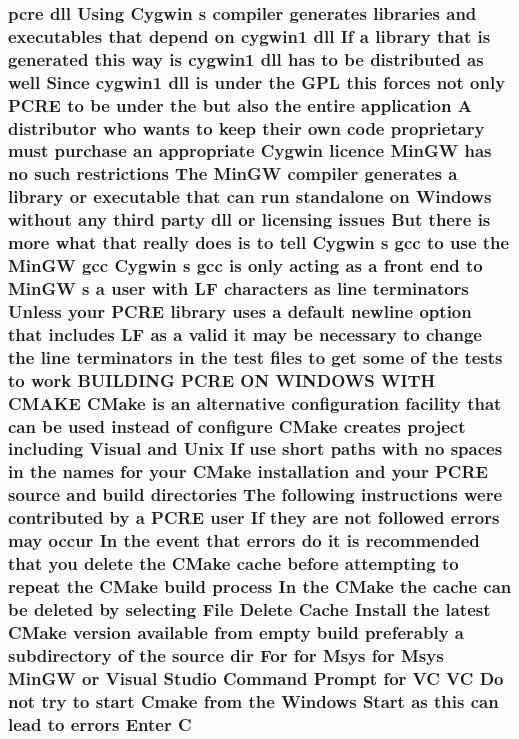 \subsubsection[{\texorpdfstring{C}{C}}]{ {\bf pcre} dll Using Cygwin {\bf s} {\bf compiler} generates {\bf libraries} and executables that depend {\bf on} cygwin1 dll If {\bf a} {\bf library} that {\bf is} {\bf generated} {\bf this} {\bf way} {\bf is} cygwin1 dll has {\bf to} {\bf be} {\bf distributed} {\bf as} well Since cygwin1 dll {\bf is} under the {\bf G\+PL} {\bf this} forces {\bf not} only {\bf P\+C\+RE} {\bf to} {\bf be} under the but also the entire application {\bf A} distributor who wants {\bf to} keep their own {\bf code} proprietary must purchase an appropriate Cygwin {\bf licence} {\bf Min\+GW} has no such restrictions The {\bf Min\+GW} {\bf compiler} generates {\bf a} {\bf library} {\bf or} executable that {\bf can} {\bf run} standalone {\bf on} {\bf Windows} without {\bf any} third party dll {\bf or} licensing issues But there {\bf is} more {\bf what} that really does {\bf is} {\bf to} tell Cygwin {\bf s} {\bf gcc} {\bf to} use the {\bf Min\+GW} {\bf gcc} Cygwin {\bf s} {\bf gcc} {\bf is} only acting {\bf as} {\bf a} front {\bf end} {\bf to} {\bf Min\+GW} {\bf s} {\bf a} user {\bf with} {\bf LF} {\bf characters} {\bf as} {\bf line} terminators Unless your {\bf P\+C\+RE} {\bf library} uses {\bf a} {\bf default} {\bf newline} {\bf option} that includes {\bf LF} {\bf as} {\bf a} valid {\bf it} may {\bf be} necessary {\bf to} change the {\bf line} terminators {\bf in} the test {\bf files} {\bf to} get some {\bf of} the {\bf tests} {\bf to} work B\+U\+I\+L\+D\+I\+NG {\bf P\+C\+RE} ON W\+I\+N\+D\+O\+WS W\+I\+TH C\+M\+A\+KE C\+Make {\bf is} an alternative configuration {\bf facility} that {\bf can} {\bf be} {\bf used} instead {\bf of} {\bf configure} C\+Make creates {\bf project} including Visual and Unix If use short paths {\bf with} no spaces {\bf in} the {\bf names} for your C\+Make installation and your {\bf P\+C\+RE} {\bf source} and build {\bf directories} The following {\bf instructions} were contributed by {\bf a} {\bf P\+C\+RE} user If they {\bf are} {\bf not} followed {\bf errors} may {\bf occur} In the event that {\bf errors} {\bf do} {\bf it} {\bf is} recommended that you delete the C\+Make {\bf cache} before attempting {\bf to} repeat the C\+Make build {\bf process} In the C\+Make the {\bf cache} {\bf can} {\bf be} deleted by selecting File Delete Cache Install the latest C\+Make version {\bf available} {\bf from} {\bf empty} build preferably {\bf a} subdirectory {\bf of} the {\bf source} {\bf dir} For for {\bf Msys} for {\bf Msys} {\bf Min\+GW} {\bf or} Visual {\bf Studio} Command Prompt for VC VC Do {\bf not} try {\bf to} {\bf start} Cmake {\bf from} the {\bf Windows} Start {\bf as} {\bf this} {\bf can} lead {\bf to} {\bf errors} Enter C}\hypertarget{NON-AUTOTOOLS-BUILD_8txt_ac5c2ebe543528426f0c731e1b7056868}{}\label{NON-AUTOTOOLS-BUILD_8txt_ac5c2ebe543528426f0c731e1b7056868}
